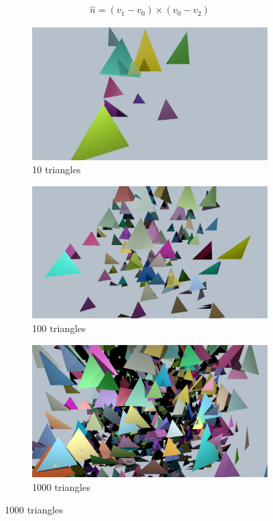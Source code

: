 \documentclass{article}
\begin{document}
\begin{align}
	\hat{n} = (v_{1} - v_{0}) \times (v_{0} - v_{2})
\end{align}

\begin{figure}[h]
	\centering
	\begin{subfigure}{0.3\textwidth}
		\includegraphics[width=\textwidth]{10_triangles}
		\caption{10 triangles}
		\label{fig:10triangles}
	\end{subfigure}%
	\hfill
	\begin{subfigure}{0.3\textwidth}
		\includegraphics[width=\textwidth]{100_triangles}
		\caption{100 triangles}
		\label{fig:100triangles}
	\end{subfigure}
	\hfill
	\begin{subfigure}{0.3\textwidth}
		\includegraphics[width=\textwidth]{1000_triangles}
		\caption{1000 triangles}
		\label{fig:1000triangles}
	\end{subfigure}
	

\end{figure}
\end{document}

